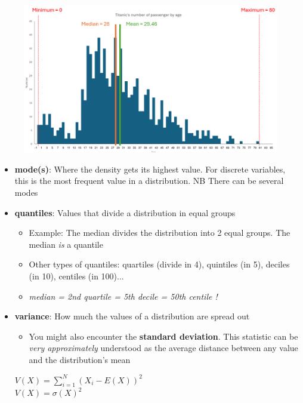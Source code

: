 \documentclass[compress]{beamer}
\begin{document}
\begin{frame}
	\begin{figure}
		\centering
		\includegraphics[scale=0.5]{Picture/Exemple titanic medium mediane.PNG}
	\end{figure}
\end{frame}

\begin{frame}
	\begin{itemize}
		\item \textbf{mode(s)}: Where the density gets its highest value. For discrete variables, this is the most frequent value in a distribution. NB There can be several modes
		\vspace{0.2cm}
		\item \textbf{quantiles}: Values that divide a distribution in equal groups
		\begin{itemize}
			\item Example: The median divides the distribution into 2 equal groups. The median \textit{is} a quantile
			\item Other types of quantiles: quartiles (divide in 4), quintiles (in 5), deciles (in 10), centiles (in 100)...
			\item \textit{median = 2nd quartile = 5th decile = 50th centile !}
		\end{itemize}
		\vspace{0.2cm}
		\item \textbf{variance}: How much the values of a distribution are spread out
		\begin{itemize}
			\item You might also encounter the \textbf{standard deviation}. This statistic can be \textit{very approximately} understood as the average distance between any value and the distribution's mean
		\end{itemize}
		\vspace{0.2cm}
		$V(X) = \sum_{i=1}^{N}(X_{i} - E(X))^{2}$ \\
		\vspace{0.2cm}
		$V(X) = \sigma(X)^2$
		\vspace{0.2cm}
	\end{itemize}
\end{frame}
\end{document}
